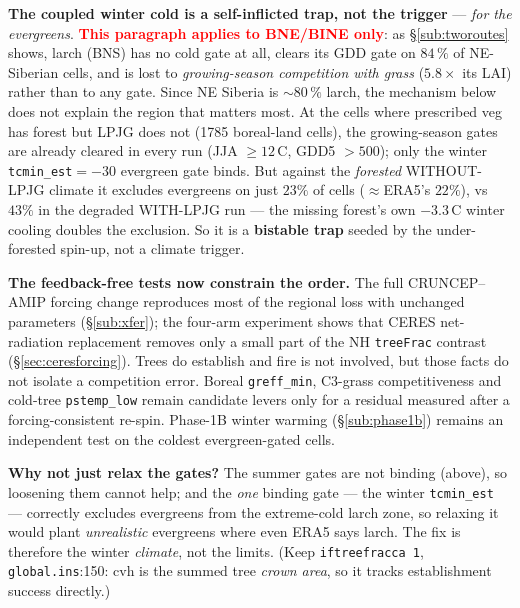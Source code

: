 \documentclass[10pt]{article}
\begin{document}
\textbf{The coupled winter cold is a self-inflicted trap, not the trigger} --- \emph{for the
evergreens}. \textcolor{red}{\textbf{This paragraph applies to BNE/BINE only}}: as
\S\ref{sub:tworoutes} shows, larch (BNS) has no cold gate at all, clears its GDD gate on
$84\,\%$ of NE-Siberian cells, and is lost to \emph{growing-season competition with grass}
($5.8\times$ its LAI) rather than to any gate. Since NE Siberia is ${\sim}80\,\%$ larch, the
mechanism below does not explain the region that matters most. At the cells where prescribed veg has
forest but LPJG does not (1785 boreal-land cells), the growing-season gates are already cleared in every run
(JJA $\ge12$\,\textdegree C, GDD5 $>500$); only the winter \texttt{tcmin\_est}$=-30$ evergreen gate binds. But against
the \emph{forested} WITHOUT-LPJG climate it excludes evergreens on just $23\%$ of cells ($\approx$ERA5's $22\%$),
vs $43\%$ in the degraded WITH-LPJG run --- the missing forest's own $-3.3$\,\textdegree C winter cooling doubles the
exclusion. So it is a \textbf{bistable trap} seeded by the under-forested spin-up, not a climate trigger.

\textbf{The feedback-free tests now constrain the order.} The full CRUNCEP--AMIP forcing change reproduces most
of the regional loss with unchanged parameters (\S\ref{sub:xfer}); the four-arm experiment shows that CERES
net-radiation replacement removes only a small part of the NH \texttt{treeFrac} contrast
(\S\ref{sec:ceresforcing}). Trees do establish and fire is not involved, but those facts do not isolate a
competition error. Boreal \texttt{greff\_min}, C3-grass competitiveness and cold-tree
\texttt{pstemp\_low} remain candidate levers only for a residual measured after a forcing-consistent re-spin.
Phase-1B winter warming (\S\ref{sub:phase1b}) remains an independent test on the coldest evergreen-gated cells.

\textbf{Why not just relax the gates?} The summer gates are not binding (above), so loosening them cannot help; and
the \emph{one} binding gate --- the winter \texttt{tcmin\_est} --- correctly excludes evergreens from the
extreme-cold larch zone, so relaxing it would plant \emph{unrealistic} evergreens where even ERA5 says larch. The
fix is therefore the winter \emph{climate}, not the limits. (Keep \texttt{iftreefracca 1}, \texttt{global.ins}:150:
cvh is the summed tree \emph{crown area}, so it tracks establishment success directly.)
\end{document}
